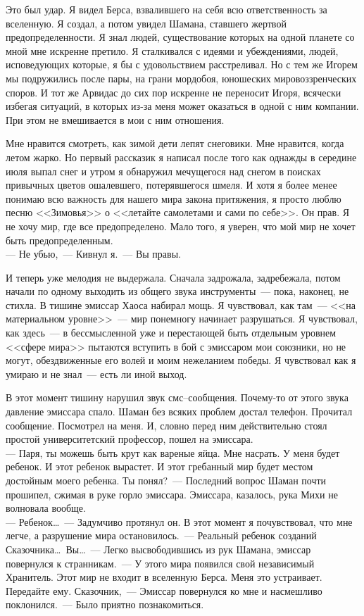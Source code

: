 Это был удар. Я видел Берса, взвалившего на себя всю ответственность за 
вселенную. Я создал, а потом увидел Шамана, ставшего жертвой 
предопределенности. Я знал людей, существование которых на одной планете со мной мне искренне 
претило. Я сталкивался с идеями и убеждениями, людей, исповедующих которые, я 
бы с удовольствием расстреливал. Но с тем же Игорем мы подружились после пары, на 
грани мордобоя, юношеских мировоззренческих споров. И тот же Арвидас до сих пор 
искренне не переносит Игоря, всячески избегая ситуаций, в которых из-за меня 
может оказаться в одной с ним компании. При этом не вмешивается в мои с ним 
отношения.

Мне нравится смотреть, как зимой дети лепят снеговики. Мне нравится, когда 
летом жарко. Но первый рассказик я написал после того как однажды в середине июля 
выпал снег и утром я обнаружил мечущегося над снегом в поисках привычных цветов 
ошалевшего, потерявшегося шмеля. И хотя я более менее понимаю всю важность для 
нашего мира закона притяжения, я просто люблю песню <<Зимовья>> о <<летайте 
самолетами и сами по себе>>. Он прав. Я не хочу мир, где все предопределено. 
Мало того, я уверен, что мой мир не хочет быть предопределенным.\\
--- Не убью,~--- Кивнул я.~--- Вы правы.

И теперь уже мелодия не выдержала. Сначала задрожала, задребежала, потом начали 
по одному выходить из общего звука инструменты~--- пока, наконец, не стихла. В 
тишине эмиссар Хаоса набирал мощь. Я чувствовал, как там~--- <<на материальном 
уровне>>~--- мир понемногу начинает разрушаться. Я чувствовал, как здесь~--- в 
бессмысленной уже и перестающей быть отдельным уровнем <<сфере мира>> пытаются 
вступить в бой с эмиссаром мои союзники, но не могут, обездвиженные его волей и 
моим нежеланием победы. Я чувствовал как я умираю и не знал~--- есть ли иной 
выход.

В этот момент тишину нарушил звук смс--сообщения. Почему-то от этого звука 
давление эмиссара спало. Шаман без всяких проблем достал телефон. Прочитал 
сообщение. Посмотрел на меня. И, словно перед ним действительно стоял простой 
университетский профессор, пошел на эмиссара.\\
--- Паря, ты можешь быть крут как вареные яйца. Мне насрать. У меня будет 
ребенок. И этот ребенок вырастет. И этот гребанный мир будет местом достойным моего 
ребенка. Ты понял?~--- Последний вопрос Шаман почти прошипел, сжимая в руке 
горло эмиссара. Эмиссара, казалось, рука Михи не волновала вообще.\\
--- Ребенок\ldots~--- Задумчиво протянул он. В этот момент я почувствовал, что 
мне легче, а разрушение мира остановилось.~--- Реальный ребенок созданий Сказочника\ldots\
Вы\ldots~--- Легко высвободившись из рук Шамана, эмиссар повернулся к странникам.~--- У 
этого мира появился свой независимый Хранитель. Этот мир не входит в вселенную Берса. 
Меня это устраивает. Передайте ему. Сказочник,~--- Эмиссар повернулся ко мне и 
насмешливо поклонился.~--- Было приятно познакомиться.

